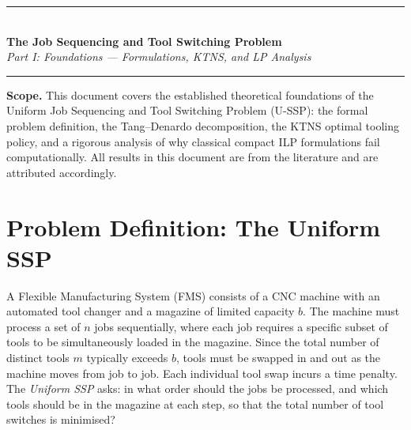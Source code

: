 \documentclass[11pt,a4paper]{article}
\theoremstyle{plain}
\theoremstyle{definition}
\begin{document}

\begin{center}
  {\color{navyblue}\rule{\textwidth}{2pt}}\\[0.4cm]
  {\LARGE\bfseries\color{navyblue}The Job Sequencing and Tool Switching Problem}\\[0.3cm]
  {\large\itshape\color{midblue}Part I: Foundations — Formulations, KTNS, and LP Analysis}\\[0.2cm]
  {\color{navyblue}\rule{\textwidth}{2pt}}
\end{center}

\begin{mdframed}[backgroundcolor=lightblue,linecolor=navyblue,linewidth=1pt,
  innerleftmargin=14pt,innerrightmargin=14pt,innertopmargin=8pt,innerbottommargin=8pt]
\small\textbf{Scope.}
This document covers the established theoretical foundations of the Uniform
Job Sequencing and Tool Switching Problem (U-SSP): the formal problem definition,
the Tang--Denardo decomposition, the KTNS optimal tooling policy, and a rigorous
analysis of why classical compact ILP formulations fail computationally.
All results in this document are from the literature and are attributed accordingly.
\end{mdframed}

\vspace{0.5cm}
\tableofcontents
\newpage

\section{Problem Definition: The Uniform SSP}
\label{sec:definition}

A Flexible Manufacturing System (FMS) consists of a CNC machine with an
automated tool changer and a magazine of limited capacity $b$.
The machine must process a set of $n$ jobs sequentially, where each job requires
a specific subset of tools to be simultaneously loaded in the magazine.
Since the total number of distinct tools $m$ typically exceeds $b$, tools must
be swapped in and out as the machine moves from job to job. Each individual tool
swap incurs a time penalty. The \emph{Uniform SSP} asks: in what order should
the jobs be processed, and which tools should be in the magazine at each step,
so that the total number of tool switches is minimised?
\end{document}
